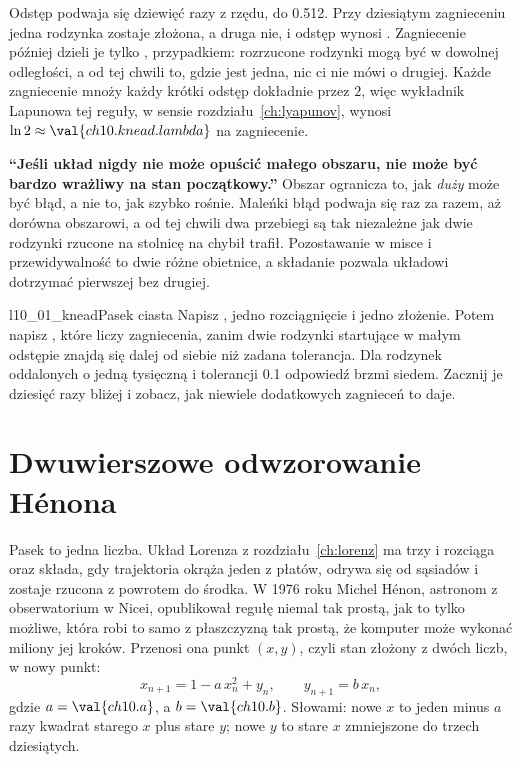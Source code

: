 \noindent
Odstęp podwaja się dziewięć razy z rzędu, do \num{0.512}. Przy dziesiątym
zagnieceniu jedna rodzynka zostaje złożona, a druga nie, i odstęp wynosi
. Zagniecenie później dzieli je tylko
, przypadkiem: rozrzucone rodzynki mogą być w
dowolnej odległości, a od tej chwili to, gdzie jest jedna, nic ci nie mówi o
drugiej. Każde zagniecenie mnoży każdy krótki odstęp dokładnie przez $2$,
więc wykładnik Lapunowa tej reguły, w sensie rozdziału~\ref{ch:lyapunov},
wynosi $\ln 2 \approx \val{ch10.knead.lambda}$ na zagniecenie.

\begin{trapbox}
\textbf{\enquote{Jeśli układ nigdy nie może opuścić małego obszaru, nie może
być bardzo wrażliwy na stan początkowy.}} Obszar ogranicza to, jak
\emph{duży} może być błąd, a nie to, jak szybko rośnie. Maleńki błąd podwaja
się raz za razem, aż dorówna obszarowi, a od tej chwili dwa przebiegi są tak
niezależne jak dwie rodzynki rzucone na stolnicę na chybił trafił.
Pozostawanie w misce i przewidywalność to dwie różne obietnice, a składanie
pozwala układowi dotrzymać pierwszej bez drugiej.
\end{trapbox}

\begin{lab}{l10_01_knead}{Pasek ciasta}
Napisz , jedno rozciągnięcie i jedno złożenie. Potem napisz
, które liczy zagniecenia, zanim dwie rodzynki
startujące w małym odstępie znajdą się dalej od siebie niż zadana tolerancja.
Dla rodzynek oddalonych o jedną tysięczną i tolerancji \num{0.1} odpowiedź
brzmi siedem. Zacznij je dziesięć razy bliżej i zobacz, jak niewiele
dodatkowych zagnieceń to daje.
\end{lab}

\section{Dwuwierszowe odwzorowanie Hénona}
\label{sec:ch10-henon}

\noindent
Pasek to jedna liczba. Układ Lorenza z rozdziału~\ref{ch:lorenz} ma trzy i
rozciąga oraz składa, gdy trajektoria okrąża jeden z płatów, odrywa się od
sąsiadów i zostaje rzucona z powrotem do środka. W 1976 roku Michel Hénon,
astronom z obserwatorium w Nicei, opublikował regułę niemal tak prostą, jak
to tylko możliwe, która robi to samo z płaszczyzną \dash{} tak prostą, że
komputer może wykonać miliony jej kroków. Przenosi ona punkt $(x, y)$, czyli
stan złożony z dwóch liczb, w nowy punkt:
\[ x_{n+1} = 1 - a\,x_n^{2} + y_n, \qquad y_{n+1} = b\,x_n, \]
gdzie $a = \val{ch10.a}$, a $b = \val{ch10.b}$. Słowami: nowe $x$ to jeden
minus $a$ razy kwadrat starego $x$ plus stare $y$; nowe $y$ to stare $x$
zmniejszone do trzech dziesiątych.

